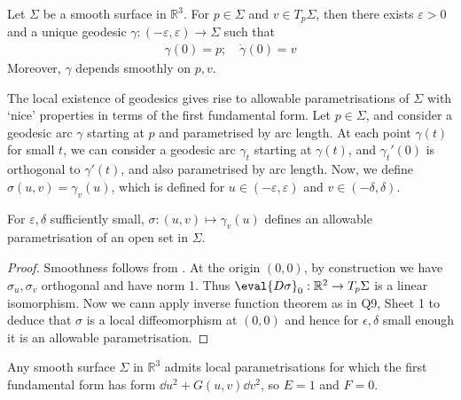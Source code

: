 \begin{corollary} \label{cor:3.4}
	Let $\Sigma$ be a smooth surface in $\mathbb R^3$.
	For $p \in \Sigma$ and $v \in T_p \Sigma$, then there exists $\varepsilon > 0$ and a unique geodesic $\gamma \colon (-\varepsilon, \varepsilon) \to \Sigma$ such that
	\begin{align*}
		\gamma(0) = p;\quad \dot \gamma(0) = v
	\end{align*}
	Moreover, $\gamma$ depends smoothly on $p,v$.
\end{corollary}

The local existence of geodesics gives rise to allowable parametrisations of $\Sigma$ with `nice' properties in terms of the first fundamental form.
Let $p \in \Sigma$, and consider a geodesic arc $\gamma$ starting at $p$ and parametrised by arc length.
At each point $\gamma(t)$ for small $t$, we can consider a geodesic arc $\gamma_t$ starting at $\gamma(t)$, and $\gamma_t'(0)$ is orthogonal to $\gamma'(t)$, and also parametrised by arc length.
Now, we define $\sigma(u,v) = \gamma_v(u)$, which is defined for $u \in (-\varepsilon,\varepsilon)$ and $v \in (-\delta,\delta)$.

\begin{lemma} \label{lem:3.5}
	For $\varepsilon, \delta$ sufficiently small, $\sigma \colon (u,v) \mapsto \gamma_v(u)$ defines an allowable parametrisation of an open set in $\Sigma$.
\end{lemma}

\begin{proof}
	Smoothness follows from .
	At the origin $(0,0)$, by construction we have $\sigma_u, \sigma_v$ orthogonal and have norm 1.
	Thus $\eval{D \sigma}_0 : \mathbb{R}^2 \to T_p \Sigma$ is a linear isomorphism.
	Now we cann apply inverse function theorem as in Q9, Sheet 1 to deduce that $\sigma$ is a local diffeomorphism at $(0, 0)$ and hence for $\epsilon, \delta$ small enough it is an allowable parametrisation.
\end{proof}

\begin{proposition} \label{prp:3.6}
	Any smooth surface $\Sigma$ in $\mathbb R^3$ admits local parametrisations for which the first fundamental form has form $\dd{u}^2 + G(u,v) \dd{v}^2$, so $E = 1$ and $F = 0$.
\end{proposition}

